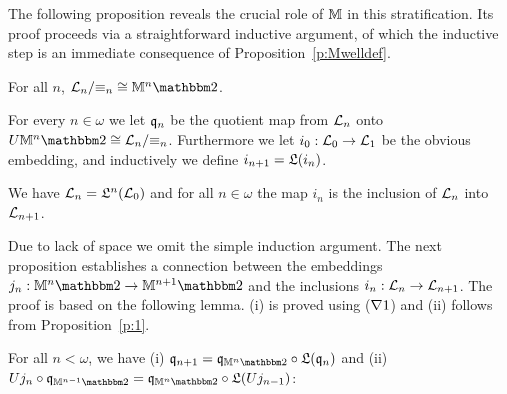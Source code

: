 \documentclass{book}
\begin{document}
The following proposition reveals the crucial role of $\mathbb{M}$ in this
stratification.  Its proof proceeds via a straightforward inductive
argument, of which the inductive step is an immediate consequence of
Proposition~\ref{p:Mwelldef}.

\begin{proposition}
For all $n$, $\xxviLang_n/{\equiv_n}\cong \xxviM^{n} \xxvibbtwo$.
\end{proposition}

\begin{definition}\label{def:qn}
For every $n \in \omega$ we let $\mathfrak{q}_n$ be the quotient map from
$\mathcal{L}_n$ onto $U \xxviM^n \xxvibbtwo \cong \xxviLang_n/{\equiv_n}$.  Furthermore we
let $i_{0}: \mathcal{L}_0 \to \mathcal{L}_1$ be the obvious embedding, and
inductively we define $i_{n+1}=\mathfrak{L} (i_{n})$.
\end{definition}

\begin{proposition}
We have $\mathcal{L}_n = \mathfrak{L}^n(\mathcal{L}_0)$
and for all $n \in \omega$ the map $i_{n}$ is the inclusion of $\mathcal{L}_n$ into $\mathcal{L}_{n+1}$.
\end{proposition}
Due to lack of space we omit the simple induction argument.
The next proposition establishes a connection between 
the embeddings $j_{n}: \xxviM^n \xxvibbtwo \to \xxviM^{n+1} \xxvibbtwo$ and the inclusions
$i_{n}: \mathcal{L}_n \to \mathcal{L}_{n+1}$. The proof is based on the following lemma. (i) is proved using ($\nabla1$) and (ii) follows from Proposition~\ref{p:1}.

\begin{lemma}\label{lem:tech_use}
For all $n<\omega$, we have  (i) $\xxviquo_{n+1}  = \xxviquo_{\xxviM^{n} \xxvibbtwo} \circ \xxviLift
(\xxviquo_n)$ and (ii) $U j_{n} \circ \xxviquo_{\xxviM^{n-1} \xxvibbtwo}=\xxviquo_{\xxviM^{n}
\xxvibbtwo} \circ \xxviLift(U j_{n-1})$:\\
%
\centerline{ 
            \quad\quad 
  } 
\end{lemma}
\end{document}
